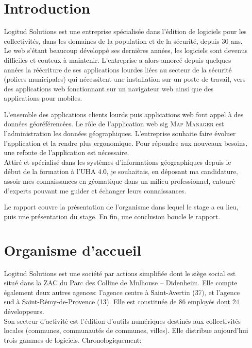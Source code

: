 \documentclass{rapportUHA40}
\begin{document}

\renewcommand{\baselinestretch}{0.9}\normalsize
\tabledematieres%
\renewcommand{\baselinestretch}{1.0}\normalsize

\setcounter{figure}{0}%


\section{Introduction}
Logitud Solutions est une entreprise spécialisée dans l'édition de logiciels
pour les collectivités, dans les domaines de la population et de la sécurité,
depuis 30 ans. Le web s'étant beaucoup développé ses dernières années, les
logiciels sont devenus difficiles et couteux à maintenir. L'entreprise a alors
amorcé depuis quelques années la réécriture de ses applications lourdes liées
au secteur de la sécurité (polices municipales) qui nécessitent une
installation sur un poste de travail, vers des applications web fonctionnant
sur un navigateur web ainsi que des applications pour mobiles.

L'ensemble des applications clients lourds puis applications web font appel à
des données géoréférencées. Le rôle de l'application web \gls{sig} \textsc{Map
  Manager} est l'administration les données géographiques. L'entreprise souhaite
faire évoluer l'application et la rendre plus ergonomique. Pour répondre aux
nouveaux besoins, une refonte de l'application est nécessaire. \\

Attiré et spécialisé dans les systèmes d'informations géographiques depuis le
début de la formation à l'UHA 4.0, je souhaitais, en déposant ma candidature,
assoir mes connaissances en géomatique dans un milieu professionnel, entouré
d'experts pouvant me guider et échanger leurs connaissances.

\vspace{2cm}

Le rapport couvre la présentation de l'organisme dans lequel le stage a eu
lieu, puis une présentation du stage. En fin, une conclusion boucle le rapport.

\newpage

\section{Organisme d'accueil}
Logitud Solutions est une société par actions simplifiée dont le siège social
est situé dans la ZAC du Parc des Colline de Mulhouse – Didenheim. Elle compte
également deux autres agences: l'agence centre à Saint-Avertin (37), et
l’agence sud à Saint-Rémy-de-Provence (13). Elle est constituée de 86 employés
dont 24 développeurs. \\ Son secteur d'activité est l'édition d'outils
numériques destinés aux collectivités locales (communes, communautés de
communes, villes). Elle distribue aujourd'hui trois gammes de logiciels.
Chronologiquement:
\end{document}
